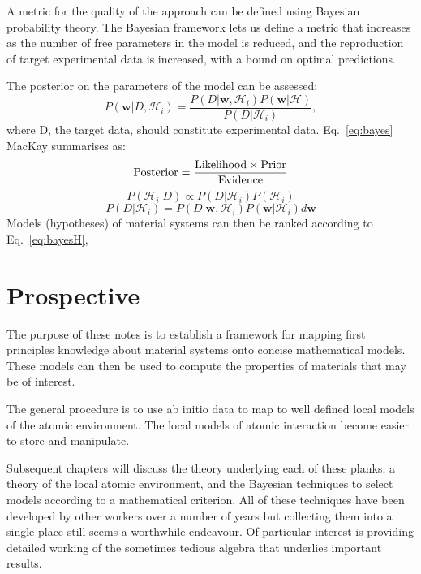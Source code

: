 A metric for the quality of the approach can be defined using 
Bayesian probability theory. The Bayesian framework lets us define a metric 
that increases as the number of free parameters in the model is reduced,
and the reproduction of target experimental data is increased, 
with a bound on optimal predictions.

The posterior on the parameters of the model can be assessed:
%
\begin{equation}
\label{eq:bayes}
P(\mathbf{w}|D, \mathcal{H}_{i}) = 
\frac{P(D|\mathbf{w}, \mathcal{H}_{i})P(\mathbf{w}|\mathcal{H})}{P(D|\mathcal{H}_{i})},
\end{equation}
%
where D, the target data, should constitute experimental data. 
Eq.~\ref{eq:bayes} MacKay summarises as:
%
\begin{equation}
{\rm Posterior} = \frac{{\rm Likelihood} \times {\rm Prior}}{{\rm Evidence}}
\end{equation}
%
\begin{equation}
\label{eq:bayesH}
P(\mathcal{H}_{i}|D) \propto P(D|\mathcal{H}_{i})P(\mathcal{H}_{i})
\end{equation}
%
\begin{equation}
\label{eq:bayesH}
P(D|\mathcal{H}_{i}) = P(D|\mathbf{w}, \mathcal{H}_{i})P(\mathbf{w}|\mathcal{H}_{i})d\mathbf{w}
\end{equation}
%
Models (hypotheses) of material systems can then be ranked according to Eq.~\ref{eq:bayesH},  

\section{Prospective}
The purpose of these notes is to establish a framework 
for mapping first principles knowledge about material systems 
onto concise mathematical models. 
%
These models can then be used to compute the properties of materials 
that may be of interest.

The general procedure is to use ab initio data to map 
to well defined local models of the atomic environment. 
The local models of atomic interaction become easier to 
store and manipulate. 

Subsequent chapters will discuss the theory underlying each of these planks; a
theory of the local atomic environment, and the Bayesian techniques to select
models according to a mathematical criterion. 
All of these techniques have been developed by other workers 
over a number of years but collecting 
them into a single place still seems a worthwhile endeavour. 
Of particular interest is providing detailed working of the sometimes 
tedious algebra that underlies important results.

